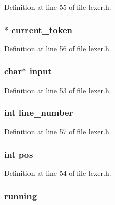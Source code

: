 Definition at line 55 of file lexer.\+h.

\hypertarget{struct_lexer_ae75af41040d594c11005ff159d8b5fbc}{
\subsubsection[{current\+\_\+token}]{$\ast$ current\+\_\+token}}\label{struct_lexer_ae75af41040d594c11005ff159d8b5fbc}


Definition at line 56 of file lexer.\+h.

\hypertarget{struct_lexer_ab7a32d1060db5fb76b1bd8aa2abced98}{
\subsubsection[{input}]{\setlength{\rightskip}{0pt plus 5cm}char$\ast$ input}}\label{struct_lexer_ab7a32d1060db5fb76b1bd8aa2abced98}


Definition at line 53 of file lexer.\+h.

\hypertarget{struct_lexer_ada7b81cc6d5bbe25b92c0162697e0f58}{
\subsubsection[{line\+\_\+number}]{\setlength{\rightskip}{0pt plus 5cm}int line\+\_\+number}}\label{struct_lexer_ada7b81cc6d5bbe25b92c0162697e0f58}


Definition at line 57 of file lexer.\+h.

\hypertarget{struct_lexer_a1910d262855b71da353ed0d07a6c7823}{
\subsubsection[{pos}]{\setlength{\rightskip}{0pt plus 5cm}int pos}}\label{struct_lexer_a1910d262855b71da353ed0d07a6c7823}


Definition at line 54 of file lexer.\+h.

\hypertarget{struct_lexer_a36f7b6be7108281af77939ceaec42fd6}{
\subsubsection[{running}]{ running}}\label{struct_lexer_a36f7b6be7108281af77939ceaec42fd6}


